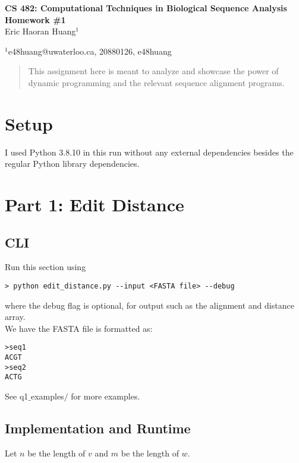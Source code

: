 \documentclass[10pt]{article}
\begin{document}
\baselineskip 12pt

\begin{center}
\textbf{\Large CS 482: Computational Techniques in Biological Sequence Analysis Homework \#1}\\

\vspace{0.5cc}
{ \sc Eric Haoran Huang$^{1}$}\\

\vspace{0.2 cm}

{\small $^{1}$e48huang@uwaterloo.ca, 20880126, e48huang}
 \end{center}

\begin{abstract}
  \noindent This assignment here is meant to analyze and showcase the power of dynamic programming and the relevant sequence alignment programs.
\end{abstract}
\section*{Setup}
I used Python 3.8.10 in this run without any external dependencies besides the regular Python library dependencies.

\section*{Part 1: Edit Distance}
\subsection*{CLI}
Run this section using
\begin{lstlisting}
> python edit_distance.py --input <FASTA file> --debug
\end{lstlisting}
where the debug flag is optional, for output such as the alignment and distance array.\\

We have the FASTA file is formatted as:
\begin{lstlisting}
>seq1
ACGT
>seq2
ACTG
\end{lstlisting}
See q1$\_$examples$/$ for more examples.

\subsection*{Implementation and Runtime}
Let $n$ be the length of $v$ and $m$ be the length of $w$.\\
\end{document}
